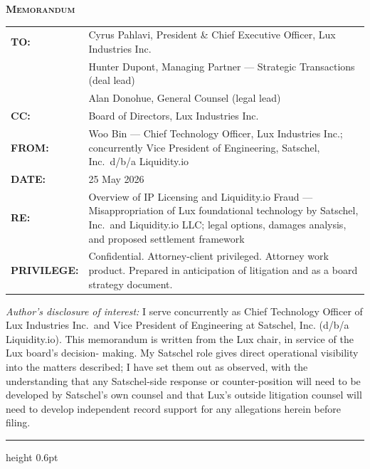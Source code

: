 \documentclass[11pt,letterpaper]{article}
\begin{document}
\begin{flushleft}
\textbf{\textsc{Memorandum}}\\[0.5em]
\begin{tabularx}{\textwidth}{lX}
\textbf{TO:}        & Cyrus Pahlavi, President \& Chief Executive Officer, Lux Industries Inc. \\
                    & Hunter Dupont, Managing Partner --- Strategic Transactions (deal lead) \\
                    & Alan Donohue, General Counsel (legal lead) \\
\textbf{CC:}        & Board of Directors, Lux Industries Inc. \\
\textbf{FROM:}      & Woo Bin --- Chief Technology Officer, Lux Industries Inc.; concurrently Vice President of Engineering, Satschel, Inc.\ d/b/a Liquidity.io \\
\textbf{DATE:}      & 25 May 2026 \\
\textbf{RE:}        & Overview of IP Licensing and Liquidity.io Fraud --- Misappropriation of Lux foundational technology by Satschel, Inc.\ and Liquidity.io LLC; legal options, damages analysis, and proposed settlement framework \\
\textbf{PRIVILEGE:} & Confidential. Attorney-client privileged. Attorney work product. Prepared in anticipation of litigation and as a board strategy document. \\
\end{tabularx}
\end{flushleft}

\vspace{0.3em}
\begin{small}
\textit{Author's disclosure of interest:} I serve concurrently as
Chief Technology Officer of Lux Industries Inc.\ and Vice President of
Engineering at Satschel, Inc. (d/b/a Liquidity.io). This memorandum is
written from the Lux chair, in service of the Lux board's decision-
making. My Satschel role gives direct operational visibility into the
matters described; I have set them out as observed, with the
understanding that any Satschel-side response or counter-position will
need to be developed by Satschel's own counsel and that Lux's outside
litigation counsel will need to develop independent record support
for any allegations herein before filing.
\end{small}

\vspace{0.5em}\hrule height 0.6pt\vspace{1em}
\end{document}
